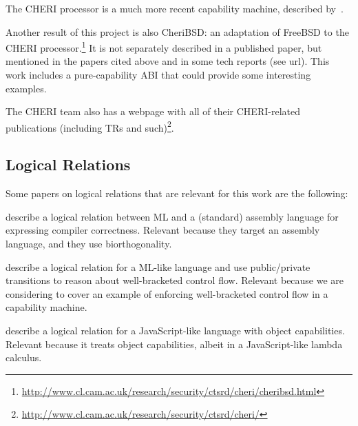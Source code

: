 \documentclass{article}
\begin{document}
The CHERI processor is a much more recent capability machine, described
by~\cite{Woodruff:2014:CCM:2665671.2665740,Watson2015Cheri}.

Another result of this project is also CheriBSD: an adaptation of FreeBSD to the
CHERI
processor.\footnote{\url{http://www.cl.cam.ac.uk/research/security/ctsrd/cheri/cheribsd.html}}
It is not separately described in a published paper, but mentioned in the papers
cited above and in some tech reports (see url). This work includes a
pure-capability ABI that could provide some interesting examples.

The CHERI team also has a webpage with all of their CHERI-related publications
(including TRs and
such)\footnote{\url{http://www.cl.cam.ac.uk/research/security/ctsrd/cheri/}}.

\subsection{Logical Relations}
\label{sec:rw-log-rel}

Some papers on logical relations that are relevant for this work are the
following:

\cite{Hur:2011:KLR:1926385.1926402} describe a logical relation between ML and
a (standard) assembly language for expressing compiler correctness.  Relevant
because they target an assembly language, and they use biorthogonality.

\cite{Dreyer:2010:IHS:1863543.1863566} describe a logical relation for a ML-like
language and use public/private transitions to reason about well-bracketed
control flow. Relevant because we are considering to cover an example of
enforcing well-bracketed control flow in a capability machine.

\cite{Devriese:2016ObjCap} describe a logical relation for a JavaScript-like
language with object capabilities.  Relevant because it treats object
capabilities, albeit in a JavaScript-like lambda calculus.



\end{document}
